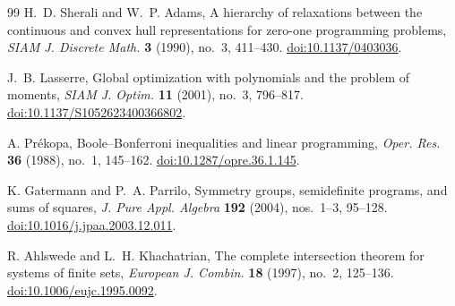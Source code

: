\documentclass[11pt]{article}
\begin{document}
\begin{thebibliography}{99}
H.~D. Sherali and W.~P. Adams,
A hierarchy of relaxations between the continuous and convex hull
representations for zero-one programming problems,
\emph{SIAM J. Discrete Math.} \textbf{3} (1990), no.~3, 411--430.
\href{https://doi.org/10.1137/0403036}{doi:10.1137/0403036}.

J.~B. Lasserre,
Global optimization with polynomials and the problem of moments,
\emph{SIAM J. Optim.} \textbf{11} (2001), no.~3, 796--817.
\href{https://doi.org/10.1137/S1052623400366802}{doi:10.1137/S1052623400366802}.

A. Pr\'ekopa,
Boole--Bonferroni inequalities and linear programming,
\emph{Oper. Res.} \textbf{36} (1988), no.~1, 145--162.
\href{https://doi.org/10.1287/opre.36.1.145}{doi:10.1287/opre.36.1.145}.

K. Gatermann and P.~A. Parrilo,
Symmetry groups, semidefinite programs, and sums of squares,
\emph{J. Pure Appl. Algebra} \textbf{192} (2004), nos.~1--3, 95--128.
\href{https://doi.org/10.1016/j.jpaa.2003.12.011}{doi:10.1016/j.jpaa.2003.12.011}.

R. Ahlswede and L.~H. Khachatrian,
The complete intersection theorem for systems of finite sets,
\emph{European J. Combin.} \textbf{18} (1997), no.~2, 125--136.
\href{https://doi.org/10.1006/eujc.1995.0092}{doi:10.1006/eujc.1995.0092}.

\end{thebibliography}
\end{document}
